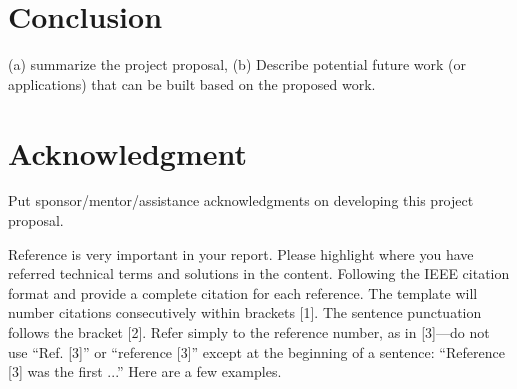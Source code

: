 \documentclass[conference,12pt]{IEEEtran}
\begin{document}
\section{Conclusion}
(a) summarize the project proposal, (b) Describe potential future work (or applications) that can be built based on the proposed work. 
\section{Acknowledgment }
Put sponsor/mentor/assistance acknowledgments on developing this project proposal.

Reference is very important in your report. Please highlight where you have
referred technical terms and solutions in the content. Following the IEEE
citation format and provide a complete citation for each reference. The template
will number citations consecutively within brackets [1]. The sentence
punctuation follows the bracket [2]. Refer simply to the reference number, as in
[3]—do not use “Ref. [3]” or “reference [3]” except at the beginning of
a sentence: “Reference [3] was the first ...” Here are a few examples.    \autocite{huang_ipv6_2014}
\printbibliography

    
\end{document}
